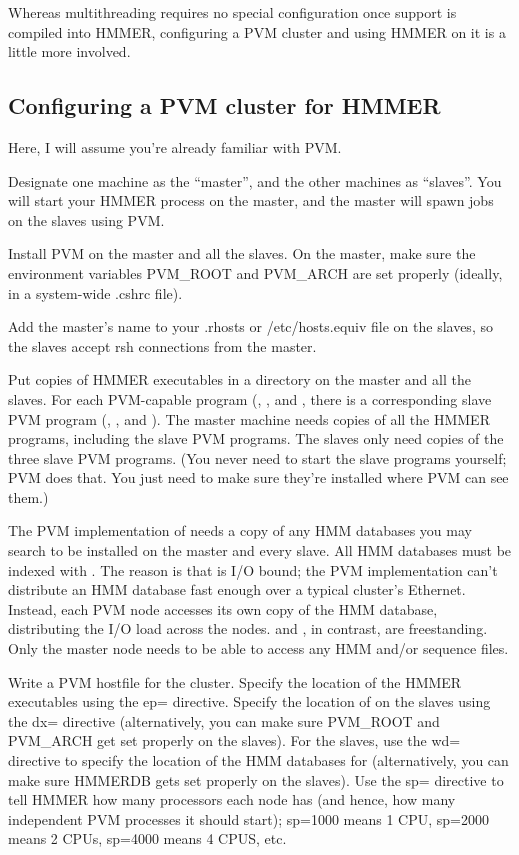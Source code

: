 Whereas multithreading requires no special configuration once support
is compiled into HMMER, configuring a PVM cluster and using HMMER on
it is a little more involved. 

\subsection{Configuring a PVM cluster for HMMER}

Here, I will assume you're already familiar with PVM.

Designate one machine as the ``master'', and the other machines as
``slaves''. You will start your HMMER process on the master, and the
master will spawn jobs on the slaves using PVM.

Install PVM on the master and all the slaves. On the master, make sure
the environment variables PVM\_ROOT and PVM\_ARCH are set properly
(ideally, in a system-wide .cshrc file).

Add the master's name to your .rhosts or /etc/hosts.equiv file on the
slaves, so the slaves accept rsh connections from the master.

Put copies of HMMER executables in a directory on the master and all
the slaves. For each PVM-capable program (,
, and , there is a corresponding slave
PVM program (, , and
). The master machine needs copies of all the HMMER
programs, including the slave PVM programs.  The slaves only need
copies of the three slave PVM programs. (You never need to start the
slave programs yourself; PVM does that. You just need to make sure
they're installed where PVM can see them.)

The PVM implementation of  needs a copy of any HMM
databases you may search to be installed on the master and every
slave. All HMM databases must be indexed with . The
reason is that  is I/O bound; the PVM implementation
can't distribute an HMM database fast enough over a typical cluster's
Ethernet. Instead, each PVM node accesses its own copy of the HMM
database, distributing the I/O load across the nodes.
 and , in contrast, are
freestanding. Only the master node needs to be able to access any HMM
and/or sequence files.

Write a PVM hostfile for the cluster. Specify the location of the
HMMER executables using the ep= directive. Specify the location of
 on the slaves using the dx= directive (alternatively, you
can make sure PVM\_ROOT and PVM\_ARCH get set properly on the
slaves). For the slaves, use the wd= directive to specify the location
of the HMM databases for  (alternatively, you can make
sure HMMERDB gets set properly on the slaves). Use the sp= directive
to tell HMMER how many processors each node has (and hence, how many
independent PVM processes it should start); sp=1000 means 1 CPU,
sp=2000 means 2 CPUs, sp=4000 means 4 CPUS, etc.

